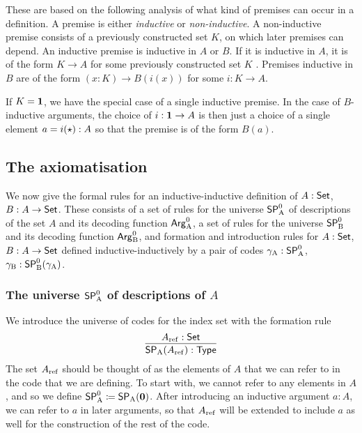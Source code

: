 \documentclass{schwicht}
\begin{document}
These are based on the following analysis of what kind of premises can
occur in a definition. A premise is either \emph{inductive} or
\emph{non-inductive}. A non-inductive premise consists of a previously
constructed set $K$, on which later premises can depend. An inductive
premise is inductive in $A$ or $B$. If it is inductive in $A$, it is
of the form $K \to A$ for some previously constructed set $K$%
. Premises inductive in $B$ are of the form $(x : K) \to
B(i(x))$ for some $i : K \to A$. 

If $K = \mathbf{1}$, we have the special case of a single inductive
premise. In the case of $B$-inductive arguments, the choice of $i :
\mathbf{1} \to A$ is then just a choice of a single element $a = i(\star)
: A$ so that the premise is of the form $B(a)$.




\subsection{The axiomatisation}
\label{sec:formal-axiomatisation}

We now give the formal rules for an inductive-inductive definition of
$A : \mathsf{Set}$, $B : A \to \mathsf{Set}$. These consists of a set of rules for the
universe $\mathsf{SP}^{0}_{\mathrm{A}}$ of descriptions of the set $A$ and its decoding
function $\mathsf{Arg}^{0}_{\mathrm{A}}$, a set of rules for the universe $\mathsf{SP}^{0}_{\mathrm{B}}$ and its
decoding function $\mathsf{Arg}^{0}_{\mathrm{B}}$, and formation and introduction rules for
$A: \mathsf{Set}$, $B: A \to \mathsf{Set}$ defined inductive-inductively by a pair of
codes $\gamma_{\mathrm{A}} : \mathsf{SP}^{0}_{\mathrm{A}}$, $\gamma_{\mathrm{B}} : \mathsf{SP}^{0}_{\mathrm{B}}(\gamma_{\mathrm{A}})$.

\subsubsection{The universe $\mathsf{SP}^{0}_{\mathrm{A}}$ of descriptions of $A$}
\label{sec:SPA}
  
We introduce the universe of codes for the index set with the
formation rule
\[
\infer{\SPA(\Aref) : \TYPE}{\Aref : \Set}
\]
The set $A_{\mathrm{ref}}$ should be thought of as the elements of $A$ that we
can refer to in the code that we are defining. To start with, we
cannot refer to any elements in $A$, and so we define $\mathsf{SP}^{0}_{\mathrm{A}} \coloneqq
\mathsf{SP}_{\mathrm{A}}(\mathbf{0})$. After introducing an inductive argument $a : A$, we can
refer to $a$ in later arguments, so that $A_{\mathrm{ref}}$ will be extended to
include $a$ as well for the construction of the rest of the code.
\end{document}
